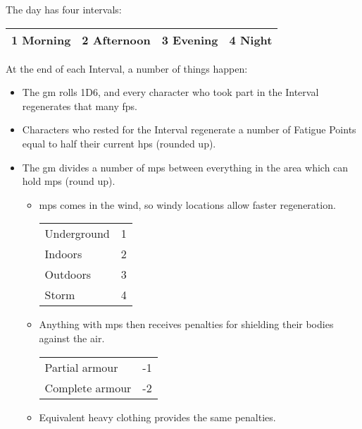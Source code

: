 The day has four intervals:

\vspace{1em}
\noindent
\begin{tabularx}{\linewidth}{c|c|c|c}

  \hline
  1 \textbf{Morning} & 2 \textbf{Afternoon} & 3 \textbf{Evening} & 4 \textbf{Night} \\
  \hline
\end{tabularx}
\vspace{1em}

At the end of each Interval, a number of things happen:

\begin{itemize}
  \item
  The \gls{gm} rolls 1D6, and every character who took part in the Interval regenerates that many \glspl{fp}.
  \item
  Characters who rested for the Interval regenerate a number of Fatigue Points equal to half their current \glspl{hp} (rounded up).
  \item
  The \gls{gm} divides a number of \glspl{mp} between everything in the area which can hold \glspl{mp} (round up).
  \begin{itemize}
    \item
    \Glspl{mp} comes in the wind, so windy locations allow faster regeneration.

    \begin{tabularx}{\linewidth}{Xc}
    \hline
    Underground & 1 \\
    Indoors     & 2 \\
    Outdoors    & 3 \\
    Storm       & 4 \\
    \hline
    \end{tabularx}
    \item
    Anything with \glspl{mp} then receives penalties for shielding their bodies against the air.

    \begin{tabularx}{\linewidth}{Xc}
    \hline
    Partial armour  & -1 \\
    Complete armour & -2 \\
    \hline
    \end{tabularx}
    \item
    Equivalent heavy clothing provides the same penalties.
  \end{itemize}
\end{itemize}
